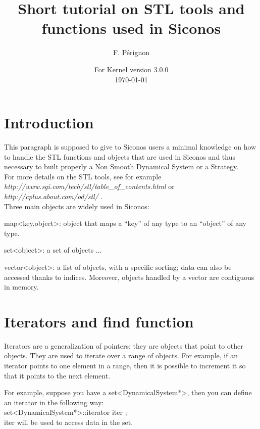 \documentclass[10pt]{article}
\begin{document}
\thispagestyle{empty}
\title{Short tutorial on STL tools and functions used in Siconos}
\author{F. P\'erignon}

\date{For Kernel version 3.0.0 \\
 \today}
\maketitle

\pagestyle{fancy}

\section{Introduction}
This paragraph is supposed to give to Siconos users a minimal knowledge on how to handle the STL functions and objects that are used in Siconos and thus necessary
to built properly a Non Smooth Dynamical System or a Strategy. \\
For more details on the STL tools, see for example \textit{http://www.sgi.com/tech/stl/table\_of\_contents.html} or \textit{ http://cplus.about.com/od/stl/ }. \\
Three main objects are widely used in Siconos:
\bei
\item map<key,object>: object that maps a ``key'' of any type to an ``object'' of any type. 
\item set<object>: a set of objects ...
\item vector<object>: a list of objects, with a specific sorting; data can also be accessed thanks to indices. Moreover, objects handled by a vector are contiguous in memory.
\ei

\section{Iterators and find function}\label{ItAndFind}

Iterators are a generalization of pointers: they are objects that point to other objects. They are used to iterate over a range of objects.
For example, if an iterator points to one element in a range, then it is possible to increment it so that it points to the next element. 

For example, suppose you have a set<DynamicalSystem*>, then you can define an iterator in the following way: \\
set<DynamicalSystem*>::iterator iter ; \\
iter will be used to access data in the set. \\
\end{document}
